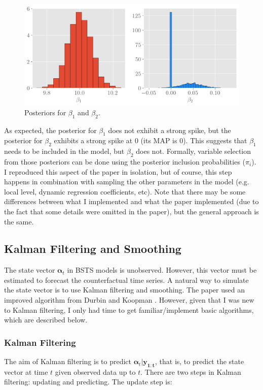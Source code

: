 \documentclass[12pt]{article}
\begin{document}
\begin{figure}[!h]
    \centering
    \includegraphics[scale=.6
    ]{../figures/posteriors.png}
    \caption{Posteriors for $\beta_1$ and $\beta_2$.}
    \label{post}
\end{figure}

As expected, the posterior for $\beta_1$ does not exhibit a strong spike, but the posterior for  $\beta_2$ exhibits a strong spike at 0 (its MAP is 0). This suggests that $\beta_1$ needs to be included in the model, but $\beta_2$ does not. Formally, variable selection from those posteriors can be done using the posterior inclusion probabilities ($\pi_i$). I reproduced this aspect of the paper in isolation, but of course, this step happens in combination with sampling the other parameters in the model (e.g. local level, dynamic regression coefficients, etc). Note that there may be some differences between what I implemented and what the paper implemented (due to the fact that some details were omitted in the paper), but the general approach is the same. 

\subsection{Kalman Filtering and Smoothing}

The state vector $\boldsymbol{\alpha}_t$ in BSTS models is unobserved. However, this vector must be estimated to  forecast the counterfactual time series. A natural way to simulate the state vector is to use Kalman filtering and smoothing. The paper used an improved algorithm from Durbin and Koopman \cite{durbin2002simple}. However, given that I was new to Kalman filtering, I only had time to get familiar/implement basic algorithms, which are described below. \\

\subsubsection{Kalman Filtering}\label{kalman}
The aim of Kalman filtering is to predict $\boldsymbol{\alpha}_{t}|\boldsymbol{y_{1:t}}$, that is, to predict the state vector at time $t$ given observed data up to  $t$. There are two steps in Kalman filtering: updating and predicting. The update step is:
\end{document}
